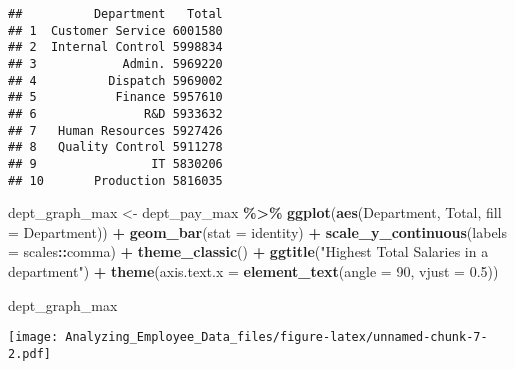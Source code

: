 \documentclass[
]{article}
\newenvironment{Shaded}{\begin{snugshade}}{\end{snugshade}}
\newcommand{\AttributeTok}[1]{\textcolor[rgb]{0.13,0.29,0.53}{#1}}
\newcommand{\DecValTok}[1]{\textcolor[rgb]{0.00,0.00,0.81}{#1}}
\newcommand{\FloatTok}[1]{\textcolor[rgb]{0.00,0.00,0.81}{#1}}
\newcommand{\FunctionTok}[1]{\textcolor[rgb]{0.13,0.29,0.53}{\textbf{#1}}}
\newcommand{\NormalTok}[1]{#1}
\newcommand{\OtherTok}[1]{\textcolor[rgb]{0.56,0.35,0.01}{#1}}
\newcommand{\SpecialCharTok}[1]{\textcolor[rgb]{0.81,0.36,0.00}{\textbf{#1}}}
\newcommand{\StringTok}[1]{\textcolor[rgb]{0.31,0.60,0.02}{#1}}
\begin{document}
\begin{verbatim}
##          Department   Total
## 1  Customer Service 6001580
## 2  Internal Control 5998834
## 3            Admin. 5969220
## 4          Dispatch 5969002
## 5           Finance 5957610
## 6               R&D 5933632
## 7   Human Resources 5927426
## 8   Quality Control 5911278
## 9                IT 5830206
## 10       Production 5816035
\end{verbatim}

\begin{Shaded}
\begin{Highlighting}[]
\NormalTok{dept\_graph\_max }\OtherTok{\textless{}{-}}\NormalTok{ dept\_pay\_max }\SpecialCharTok{\%\textgreater{}\%} 
  \FunctionTok{ggplot}\NormalTok{(}\FunctionTok{aes}\NormalTok{(Department,}
\NormalTok{             Total,}
             \AttributeTok{fill =}\NormalTok{ Department)) }\SpecialCharTok{+} 
  \FunctionTok{geom\_bar}\NormalTok{(}\AttributeTok{stat =} \StringTok{\textquotesingle{}identity\textquotesingle{}}\NormalTok{) }\SpecialCharTok{+}
  \FunctionTok{scale\_y\_continuous}\NormalTok{(}\AttributeTok{labels =}\NormalTok{ scales}\SpecialCharTok{::}\NormalTok{comma) }\SpecialCharTok{+} 
  \FunctionTok{theme\_classic}\NormalTok{() }\SpecialCharTok{+} \FunctionTok{ggtitle}\NormalTok{(}\StringTok{"Highest Total Salaries in a department"}\NormalTok{) }\SpecialCharTok{+} \FunctionTok{theme}\NormalTok{(}\AttributeTok{axis.text.x =} \FunctionTok{element\_text}\NormalTok{(}\AttributeTok{angle =} \DecValTok{90}\NormalTok{, }\AttributeTok{vjust =} \FloatTok{0.5}\NormalTok{))}

\NormalTok{dept\_graph\_max}
\end{Highlighting}
\end{Shaded}

\texttt{[image: Analyzing\_Employee\_Data\_files/figure-latex/unnamed-chunk-7-2.pdf]}
\end{document}
